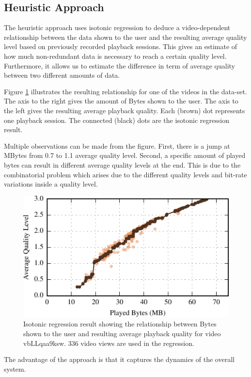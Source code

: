 
\subsection{Heuristic Approach}

The heuristic approach uses isotonic regression \cite{barlow1972statistical} to deduce a video-dependent relationship between the data shown to the user and the resulting average quality level based on previously recorded playback sessions.
This gives an estimate of how much non-redundant data is necessary to reach a certain quality level.
Furthermore, it allows us to estimate the difference in term of average quality between two different amounts of data.

Figure \ref{fig:heuristic} illustrates the resulting relationship for one of the videos in the data-set.
The axis to the right gives the amount of Bytes shown to the user.
The axis to the left gives the resulting average playback quality.
Each (brown) dot represents one playback session.
The connected (black) dots are the isotonic regression result.

Multiple observations can be made from the figure. 
First, there is a jump at \unit[20]{MBytes} from 0.7 to 1.1 average quality level. 
Second, a specific amount of played bytes can result in different average quality levels at the end. 
This is due to the combinatorial problem which arises due to the different quality levels and bit-rate variations inside a quality level.




\begin{figure}[t]
\centering
\includegraphics[width=0.9\linewidth]{figs/32_vbLLqaa9ksw.pdf}%
\caption{Isotonic regression result showing the relationship between Bytes shown to the user and resulting average playback quality for video vbLLqaa9ksw. 336 video views are used in the regression.}
\label{fig:heuristic}%
\end{figure}

The advantage of the approach is that it captures the dynamics of the overall system. 

